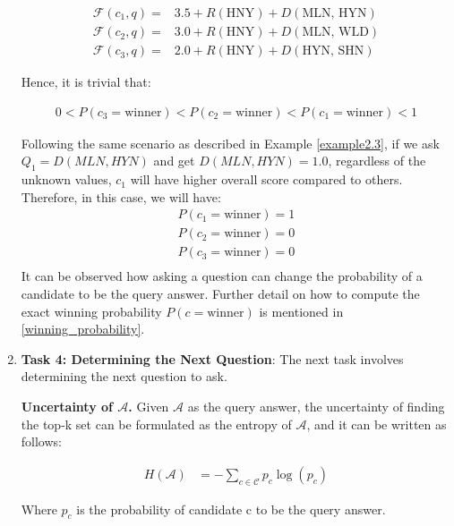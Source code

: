\begin{enumerate}
\begin{example}
    \[
\begin{aligned}
    \mathcal{F}(c_1, q) 
    = & 3.5 + R(\text{HNY}) + D(\text{MLN, HYN}) \\
    \mathcal{F}(c_2, q) 
    = & 3.0 + R(\text{HNY}) + D(\text{MLN, WLD}) \\
    \mathcal{F}(c_3, q) 
    = & 2.0 + R(\text{HNY}) + D(\text{HYN, SHN}) 
\end{aligned}
\]  

Hence, it is trivial that: 

\begin{align*}
    0 < P(c_3 = \text{winner}) < P(c_2 = \text{winner}) < P(c_1 = \text{winner}) < 1
\end{align*}

Following the same scenario as described in Example \ref{example2.3}, if we ask $Q_1 = D(MLN, HYN)$ and get \(D(MLN, HYN) = 1.0 \), regardless of the unknown values, $c_1$ will have higher overall score compared to others. Therefore, in this case, we will have:
\begin{align*}
   P(c_1 = \text{winner}) = 1 \\
   P(c_2 = \text{winner}) = 0 \\
   P(c_3 = \text{winner}) = 0 \\
\end{align*}
It can be observed how asking a question can change the probability of a candidate to be the query answer. Further detail on how to compute the exact winning probability $P(c = \text{winner})$ is mentioned in \autoref{winning_probability}. 

    
    \end{example}
    
    \item \textbf{Task 4: Determining the Next Question}: The next task involves determining the next question to ask. 

 \begin{definition}
     {\bf Uncertainty of $\mathcal{A}$.} {Given $\mathcal{A}$ as the query answer, the uncertainty of finding the top-k set can be formulated as the entropy of $\mathcal{A}$, and it can be written as follows: }
     
    \begin{align*}
    H(\mathcal{A}) &= - \sum_{c \in \mathcal{C}} p_c \log(p_c)
\end{align*}


    Where $p_c$ is the probability of candidate c to be the query answer. 
    \end{definition}


\end{enumerate}

